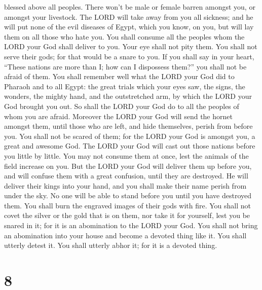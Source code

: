 blessed above all peoples. There won't be male or female barren amongst
you, or amongst your livestock.  The LORD will take away
from you all sickness; and he will put none of the evil diseases of
Egypt, which you know, on you, but will lay them on all those who hate
you.  You shall consume all the peoples whom the LORD
your God shall deliver to you. Your eye shall not pity them. You shall
not serve their gods; for that would be a snare to you. 
If you shall say in your heart, ``These nations are more than I; how can
I dispossess them?''  you shall not be afraid of them.
You shall remember well what the LORD your God did to Pharaoh and to all
Egypt:  the great trials which your eyes saw, the signs,
the wonders, the mighty hand, and the outstretched arm, by which the
LORD your God brought you out. So shall the LORD your God do to all the
peoples of whom you are afraid.  Moreover the LORD your
God will send the hornet amongst them, until those who are left, and
hide themselves, perish from before you.  You shall not
be scared of them; for the LORD your God is amongst you, a great and
awesome God.  The LORD your God will cast out those
nations before you little by little. You may not consume them at once,
lest the animals of the field increase on you.  But the
LORD your God will deliver them up before you, and will confuse them
with a great confusion, until they are destroyed.  He
will deliver their kings into your hand, and you shall make their name
perish from under the sky. No one will be able to stand before you until
you have destroyed them.  You shall burn the engraved
images of their gods with fire. You shall not covet the silver or the
gold that is on them, nor take it for yourself, lest you be snared in
it; for it is an abomination to the LORD your God.  You
shall not bring an abomination into your house and become a devoted
thing like it. You shall utterly detest it. You shall utterly abhor it;
for it is a devoted thing.

\hypertarget{section-7}{%
\section{8}\label{section-7}}

